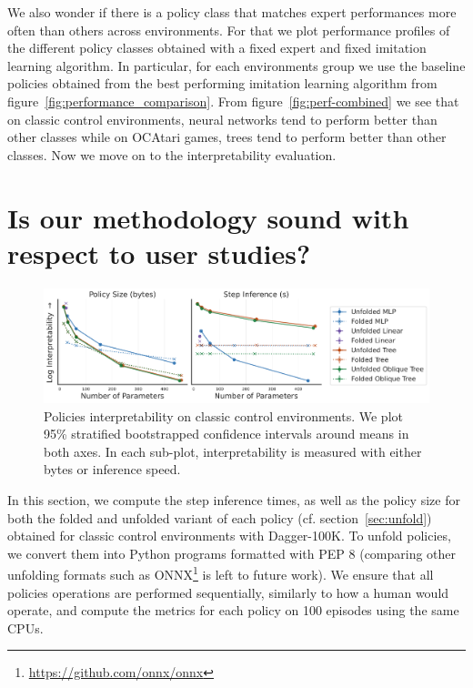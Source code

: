 We also wonder if there is a policy class that matches expert performances more often than others across environments.
For that we plot performance profiles of the different policy classes obtained with a fixed expert and fixed imitation learning algorithm.
In particular, for each environments group we use the baseline policies obtained from the best performing imitation learning algorithm from figure~\ref{fig:performance_comparison}.
From figure~\ref{fig:perf-combined} we see that on classic control environments, neural networks tend to perform better than other classes while on OCAtari games, trees tend to perform better than other classes.
Now we move on to the interpretability evaluation.

\section{Is our methodology sound with respect to user studies?}

\begin{figure}
    \centering
    \includegraphics[width=1\linewidth]{images/images_part3/tree_sizes_memory_ppo_ci_ablation.pdf}
    \caption{Policies interpretability on classic control environments. We plot 95\% stratified bootstrapped confidence intervals around means in both axes. In each sub-plot, interpretability is measured with either bytes or inference speed.}
    \label{fig:abl-proxies}
\end{figure}

In this section, we compute the step inference times, as well as the policy size for both the folded and unfolded variant of each policy (cf. section~\ref{sec:unfold}) obtained for classic control environments with Dagger-100K.
To unfold policies, we convert them into Python programs formatted with PEP 8 (comparing other unfolding formats such as ONNX\footnote{\url{https://github.com/onnx/onnx}} is left to future work).
We ensure that all policies operations are performed sequentially, similarly to how a human would operate, and compute the metrics for each policy on 100 episodes using the same CPUs.

